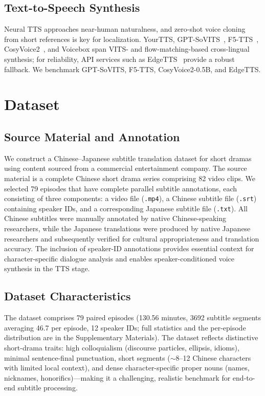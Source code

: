 \documentclass[mathematics,article,submit,xetex,moreauthors]{Definitions/mdpi}
\begin{document}
\subsection{Text-to-Speech Synthesis}
Neural TTS approaches near-human naturalness, and zero-shot voice cloning from short references is key for localization.
YourTTS, GPT-SoVITS~\cite{gptsovits2024}, F5-TTS~\cite{chen2024f5tts}, CosyVoice2~\cite{cosyvoice2_2024}, and Voicebox span VITS- and flow-matching-based cross-lingual synthesis; for reliability, API services such as EdgeTTS~\cite{edgetts2024} provide a robust fallback.
We benchmark GPT-SoVITS, F5-TTS, CosyVoice2-0.5B, and EdgeTTS.

\section{Dataset}
\label{sec:dataset}

\subsection{Source Material and Annotation}
We construct a Chinese--Japanese subtitle translation dataset for short dramas using content sourced from a commercial entertainment company.
The source material is a complete Chinese short drama series comprising 82 video clips.
We selected 79 episodes that have complete parallel subtitle annotations, each consisting of three components: a video file (\texttt{.mp4}), a Chinese subtitle file (\texttt{.srt}) containing speaker IDs, and a corresponding Japanese subtitle file (\texttt{.txt}).
All Chinese subtitles were manually annotated by native Chinese-speaking researchers, while the Japanese translations were produced by native Japanese researchers and subsequently verified for cultural appropriateness and translation accuracy.
The inclusion of speaker-ID annotations provides essential context for character-specific dialogue analysis and enables speaker-conditioned voice synthesis in the TTS stage.

\subsection{Dataset Characteristics}
The dataset comprises 79 paired episodes (130.56 minutes, 3692 subtitle segments averaging 46.7 per episode, 12 speaker IDs; full statistics and the per-episode distribution are in the Supplementary Materials).
The dataset reflects distinctive short-drama traits: high colloquialism (discourse particles, ellipsis, idioms), minimal sentence-final punctuation, short segments ($\sim$8--12 Chinese characters with limited local context), and dense character-specific proper nouns (names, nicknames, honorifics)---making it a challenging, realistic benchmark for end-to-end subtitle processing.
\end{document}
